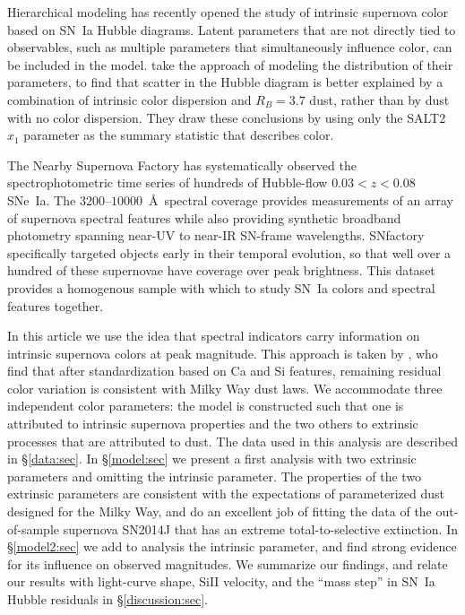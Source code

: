 \documentclass{aastex61}   	%
\begin{document}
Hierarchical modeling has recently opened
the study of intrinsic supernova color based on SN~Ia Hubble diagrams. Latent parameters that are not directly tied to observables,
such as multiple parameters that simultaneously influence color, can be included in the model.
\citet{2016arXiv160904470M} take the approach of modeling the distribution of their parameters, to find that
scatter in the Hubble diagram is better explained by a combination of intrinsic color dispersion and
$R_B=3.7$ dust, rather than by dust with no color dispersion.
They draw these conclusions by using only the SALT2 $x_1$ parameter as the summary statistic that describes color.

The Nearby Supernova Factory \citep[SNfactory;][]{2002SPIE.4836...61A} has systematically observed the
spectrophotometric time series of hundreds of Hubble-flow $0.03<z<0.08$ SNe~Ia.   The $3200$--$10000$~\AA\ spectral coverage
provides measurements of an array of supernova spectral features while also providing synthetic broadband photometry
spanning near-UV to near-IR SN-frame wavelengths.  SNfactory specifically targeted objects
early in their temporal evolution, so that well over a hundred of these supernovae have  coverage over
peak brightness.  This dataset provides a homogenous sample with which to study SN~Ia colors and spectral features together.

In this article we use the idea that spectral indicators carry information on intrinsic supernova colors at peak magnitude.
\color{red}
This approach is taken by \citet{2011A&A...529L...4C}, who find that after standardization based on Ca and Si features, remaining residual color
variation is consistent with Milky Way dust laws.
We accommodate  three independent color parameters: the model is constructed such that one is attributed to intrinsic supernova
properties and the two others to
extrinsic processes that are attributed to dust.
\color{black}
The data used in this analysis are described in \S\ref{data:sec}.
In \S\ref{model:sec} we present a
first analysis with two extrinsic parameters and omitting the intrinsic parameter.  The properties of the two extrinsic parameters
are consistent with the expectations of parameterized dust designed for the Milky Way, and do an excellent job of fitting the data of the out-of-sample
supernova SN2014J that has an extreme total-to-selective extinction.
In \S\ref{model2:sec} we add to analysis the intrinsic parameter, and find strong evidence for its influence on observed magnitudes.
We summarize our findings, and relate our results with light-curve shape, SiII velocity, and the ``mass step'' in SN~Ia Hubble
residuals in \S\ref{discussion:sec}.
\end{document}
